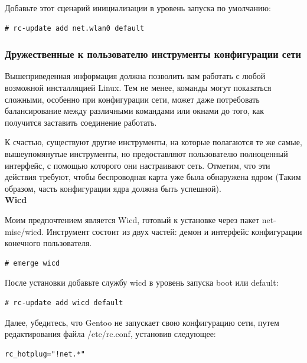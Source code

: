 \documentclass[10pt]{book}
\begin{document}
Добавьте этот сценарий инициализации в уровень запуска по умолчанию:

\begin{tcolorbox}
\begin{lstlisting}
# rc-update add net.wlan0 default
\end{lstlisting}
\end{tcolorbox}

\subsubsection{Дружественные к пользователю инструменты конфигурации сети}
Вышеприведенная информация должна позволить вам работать с любой возможной инсталляцией Linux. Тем не менее, команды могут показаться сложными, особенно при конфигурации сети, может даже потребовать балансирование между различными командами или окнами до того, как получится заставить соединение работать.

К счастью, существуют другие инструменты, на которые полагаются те же самые, вышеупомянутые инструменты, но предоставляют пользователю полноценный интерфейс, с помощью которого они настраивают сеть. Отметим, что эти действия требуют, чтобы беспроводная карта уже была обнаружена ядром (Таким образом, часть конфигурации ядра должна быть успешной). \\

\textbf{Wicd}

Моим предпочтением является Wicd, готовый к установке через пакет net-misc/wicd. Инструмент состоит из двух частей: демон и интерфейс конфигурации конечного пользователя.

\begin{tcolorbox}
\begin{lstlisting}
# emerge wicd
\end{lstlisting}
\end{tcolorbox}

После установки добавьте службу wicd в уровень запуска boot или default:

\begin{tcolorbox}
\begin{lstlisting}
# rc-update add wicd default
\end{lstlisting}
\end{tcolorbox}

Далее, убедитесь, что Gentoo не запускает свою конфигурацию сети, путем редактирования файла /etc/rc.conf, установив следующее:

\begin{tcolorbox}
\begin{lstlisting}
rc_hotplug="!net.*"
\end{lstlisting}
\end{tcolorbox}
\end{document}
